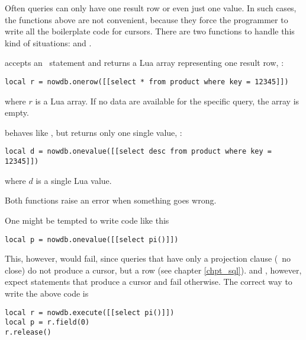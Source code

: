 Often queries can only have one result row or even
just one value. In such cases, the functions above
are not convenient, because they force the programmer
to write all the boilerplate code for cursors.
There are two functions to handle this kind of
situations:  and
.

\clearpage
{} accepts an \sql\ statement
and returns a Lua array representing one
result row, \eg:

\begin{lua}
\begin{lstlisting}
local r = nowdb.onerow([[select * from product where key = 12345]])
\end{lstlisting}
\end{lua}

where $r$ is a Lua array.
If no data are available for the specific query,
the array is empty.

 behaves like ,
but returns only one single value, \eg:

\begin{lua}
\begin{lstlisting}
local d = nowdb.onevalue([[select desc from product where key = 12345]])
\end{lstlisting}
\end{lua}

where $d$ is a single Lua value.

Both functions raise an error when something goes wrong.

One might be tempted to write code like this

\begin{lua}
\begin{lstlisting}
local p = nowdb.onevalue([[select pi()]])
\end{lstlisting}
\end{lua}

This, however, would fail, since queries
that have only a projection clause (\ie\ no  close)
do not produce a cursor, but a row (see chapter \ref{chpt_sql}).
 and , however, expect
statements that produce a cursor and fail otherwise.
The correct way to write the above code is

\begin{lua}
\begin{lstlisting}
local r = nowdb.execute([[select pi()]])
local p = r.field(0)
r.release()
\end{lstlisting}
\end{lua}

